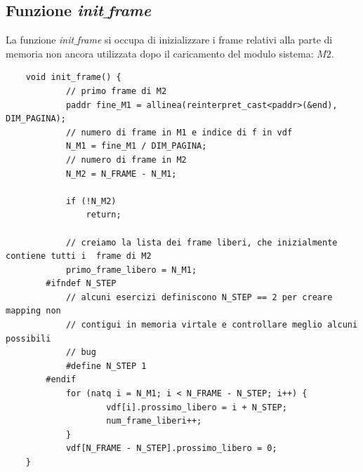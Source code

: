 \documentclass[11pt]{report}
\theoremstyle{definition}
\begin{document}
\subsection{Funzione \emph{init$\_$frame}}
La funzione \emph{init$\_$frame} si occupa di inizializzare i frame relativi alla parte di memoria non ancora utilizzata dopo il caricamento del modulo sistema: $M2$. 
\small 
\begin{verbatim}
	void init_frame() {
		    // primo frame di M2
		    paddr fine_M1 = allinea(reinterpret_cast<paddr>(&end), DIM_PAGINA);
		    // numero di frame in M1 e indice di f in vdf
		    N_M1 = fine_M1 / DIM_PAGINA;
		    // numero di frame in M2
		    N_M2 = N_FRAME - N_M1;
		
		    if (!N_M2)
		        return;
		
		    // creiamo la lista dei frame liberi, che inizialmente contiene tutti i  frame di M2
		    primo_frame_libero = N_M1;
		#ifndef N_STEP
		    // alcuni esercizi definiscono N_STEP == 2 per creare mapping non
		    // contigui in memoria virtale e controllare meglio alcuni possibili
		    // bug
		    #define N_STEP 1
		#endif
		    for (natq i = N_M1; i < N_FRAME - N_STEP; i++) {
			        vdf[i].prossimo_libero = i + N_STEP;
			        num_frame_liberi++;
		    }
		    vdf[N_FRAME - N_STEP].prossimo_libero = 0;
	}
\end{verbatim}
\normalsize 
\end{document}
